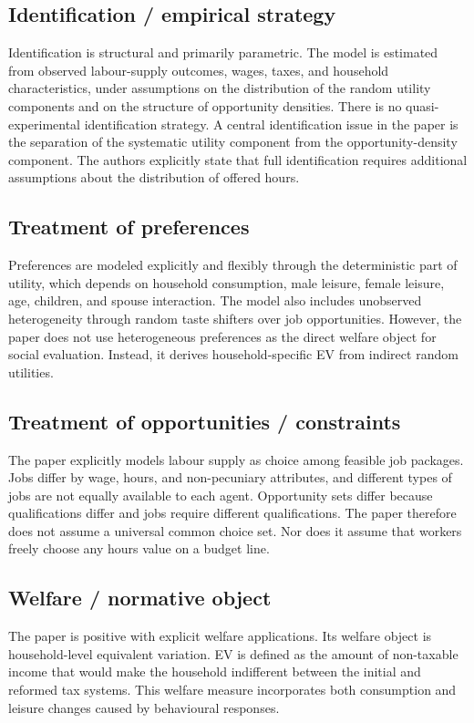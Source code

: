 \documentclass[11pt,a4paper]{article}
\begin{document}
\subsection*{Identification / empirical strategy}
Identification is structural and primarily parametric. The model is estimated from observed labour-supply outcomes, wages, taxes, and household characteristics, under assumptions on the distribution of the random utility components and on the structure of opportunity densities. There is no quasi-experimental identification strategy. A central identification issue in the paper is the separation of the systematic utility component from the opportunity-density component. The authors explicitly state that full identification requires additional assumptions about the distribution of offered hours.

\subsection*{Treatment of preferences}
Preferences are modeled explicitly and flexibly through the deterministic part of utility, which depends on household consumption, male leisure, female leisure, age, children, and spouse interaction. The model also includes unobserved heterogeneity through random taste shifters over job opportunities. However, the paper does not use heterogeneous preferences as the direct welfare object for social evaluation. Instead, it derives household-specific EV from indirect random utilities.

\subsection*{Treatment of opportunities / constraints}
The paper explicitly models labour supply as choice among feasible job packages. Jobs differ by wage, hours, and non-pecuniary attributes, and different types of jobs are not equally available to each agent. Opportunity sets differ because qualifications differ and jobs require different qualifications. The paper therefore does not assume a universal common choice set. Nor does it assume that workers freely choose any hours value on a budget line.

\subsection*{Welfare / normative object}
The paper is positive with explicit welfare applications. Its welfare object is household-level equivalent variation. EV is defined as the amount of non-taxable income that would make the household indifferent between the initial and reformed tax systems. This welfare measure incorporates both consumption and leisure changes caused by behavioural responses.
\end{document}
